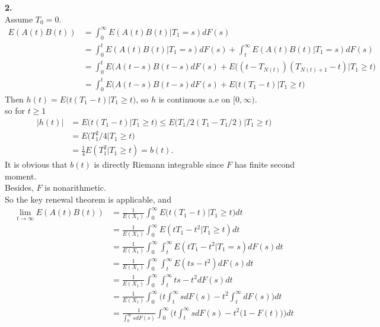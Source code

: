 \documentclass{amsart}
\theoremstyle{plain}
\theoremstyle{definition}
\begin{document}
 \noindent \textbf{2.}\\
Assume $T_0 = 0$.\\
\begin{align*}
	E(A(t)B(t)) &= \int_{0}^{\infty}E(A(t)B(t)|T_1 = s)dF(s) \\
			    	  	 &= \int_{0}^{t}E(A(t)B(t)|T_1 = s)dF(s) + \int_{t}^{\infty}E(A(t)B(t)|T_1 = s)dF(s) \\
			   		 	&= \int_{0}^{t} E(A(t-s)B(t-s)dF(s) + E\Big((t-T_{N(t)})(T_{N(t)+1} - t) | T_1 \geq t\Big)\\
			  	 	  &= \int_{0}^{t} E(A(t-s)B(t-s)dF(s) + E\big(t(T_1 - t)| T_1 \geq t\Big) 
\end{align*}
Then $h(t) = E\big(t(T_1 - t) | T_1 \geq t \big) $, so $h$ is continuous a.e on $[0,\infty)$.\\
	so for $t \geq 1$
	\begin{align*}
		|h(t)|  &= E\big(t(T_1 - t)|T_1 \geq t) \leq E\big(T_1/2(T_1 - T_1/2)|T_1 \geq t\big) \\
				&= E\big(T_1^2/4\big|T_1 \geq t) \\
				&= \frac{1}{4}E(T_1^2|T_1 \geq  t) = b(t). 
	\end{align*}
	It is obvious that $b(t)$ is directly Riemann integrable since $F$ has finite second moment.\\
	Besides, $F$ is nonarithmetic.\\
	So the key renewal theorem is applicable, and \\
	\begin{align*}	
		\lim_{t\to \infty} E(A(t)B(t)) &= \frac{1}{E(X_1)}\int_0^{\infty}E\big(t(T_1 - t)| T_1 \geq t\Big)dt \\
									   &= \frac{1}{E(X_1)} \int_0^{\infty} E(tT_1-t^2 | T_1 \geq t )dt \\
				  			 		   &= \frac{1}{E(X_1)} \int_0^{\infty} \int_{t}^{\infty} E(tT_1-t^2 | T_1= s) dF(s)dt \\
						 		   	   &= \frac{1}{E(X_1)} \int_0^{\infty} \int_{t}^{\infty} E(ts-t^2) dF(s)dt\\
									   &= \frac{1}{E(X_1)} \int_0^{\infty} \int_{t}^{\infty} ts-t^2 dF(s)dt \\
									   &= \frac{1}{E(X_1)} \int_0^{\infty} \Bigg(t\int_{t}^{\infty}sdF(s)-t^2\int_{t}^{\infty} dF(s)\Bigg)dt \\
									   &= \frac{1}{\int_{0}^{\infty}sdF(s)} \int_0^{\infty} \Bigg(t\int_{t}^{\infty}sdF(s)-t^2\big(1-F(t)\big)\Bigg)dt
	\end{align*}
\end{document}
